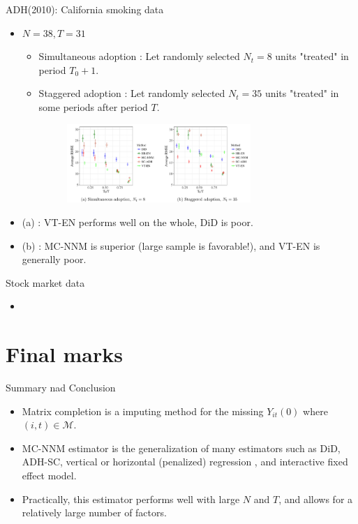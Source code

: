 \documentclass[xcolor=svgnames,aspectratio=169]{beamer}
\begin{document}
\begin{frame}{ADH(2010): California smoking data}
    \begin{itemize}
        \item $N=38, T=31$
        \begin{itemize}
            \item Simultaneous adoption : Let randomly selected $N_t=8$ units "treated" in period $T_0+1$.
            \item Staggered adoption : Let randomly selected $N_t=35$ units "treated" in some periods after period $T$.
            \begin{figure}
            \includegraphics[width=0.7\textwidth, height=0.4\textheight, keepaspectratio]{ADH.png}
            \end{figure}
        \end{itemize}
        \item (a) : VT-EN performs well on the whole, DiD is poor.
        \item (b) : MC-NNM is superior (large sample is favorable!), and VT-EN is generally poor.
    \end{itemize}
\end{frame}

\begin{frame}{Stock market data}
    \begin{itemize}
        \item 
    \end{itemize}
\end{frame}

\section{Final marks}

\begin{frame}{Summary nad Conclusion}
    \begin{itemize}
        \item Matrix completion is a imputing method for the missing $Y_{it}(0)$ where $(i,t)\in \mathcal{M}$.
        \item MC-NNM estimator is the generalization of many estimators such as DiD, ADH-SC, vertical or horizontal (penalized) regression , and interactive fixed effect model.
        \item Practically, this estimator performs well with large $N$ and $T$, and allows for a relatively large number of factors.
    \end{itemize}
\end{frame}
\end{document}
